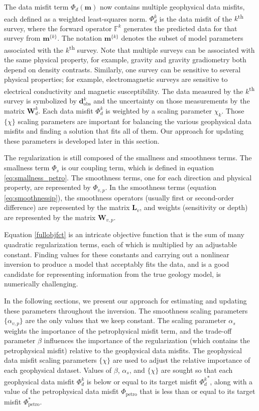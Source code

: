 \documentclass[extra, mreferee]{gji_joint} %
\begin{document}
The data misfit term $\Phi_d(\mathbf{m})$ now contains multiple geophysical data misfits, each defined as a weighted least-squares norm. $\Phi_d^k$ is the data misfit of the $k$\textsuperscript{th} survey, where the forward operator $\mathbb{F}^k$ generates the predicted data for that survey from $\mathbf{m}^{\{k\}}$. The notation $\mathbf{m}^{\{k\}}$ denotes the subset of model parameters associated with the $k$\textsuperscript{th} survey. Note that multiple surveys can be associated with the same physical property, for example, gravity and gravity gradiometry both depend on density contrasts. Similarly, one survey can be sensitive to several physical properties; for example, electromagnetic surveys are sensitive to electrical conductivity and magnetic susceptibility. The data measured by the $k$\textsuperscript{th} survey is symbolized by $\mathbf{d}_{\text{obs}}^k$ and the uncertainty on those measurements by the matrix $\mathbf{W}_{d}^k$. Each data misfit $\Phi_d^k$ is weighted by a scaling parameter $\chi_k$. Those $\{\chi\}$ scaling parameters are important for balancing the various geophysical data misfits and finding a solution that fits all of them. Our approach for updating these parameters is developed later in this section.

The regularization is still composed of the smallness and smoothness terms. The smallness term $\Phi_s$ is our coupling term, which is defined in equation \eqref{eq:smallness_petro}. The smoothness terms, one for each direction and physical property, are represented by $\Phi_{v, p}$. In the smoothness terms (equation \eqref{eq:smoothnessip}), the smoothness operators (usually first or second-order difference) are represented by the matrix $\mathbf{L}_v$, and weights (sensitivity or depth) are represented by the matrix $\mathbf{W}_{v,p}$.

Equation \ref{fullobjfct} is an intricate objective function that is the sum of many quadratic regularization terms, each of which is multiplied by an adjustable constant. Finding values for these constants and carrying out a nonlinear inversion to produce a model that acceptably fits the data, and is a good candidate for representing information from the true geology model, is numerically challenging.

In the following sections, we present our approach for estimating and updating these parameters throughout the inversion. The smoothness scaling parameters $\{\alpha_{v, p}\}$ are the only values that we keep constant. The scaling parameter $\alpha_s$ weights the importance of the petrophysical misfit term, and the trade-off parameter $\beta$ influences the importance of the regularization (which contains the petrophysical misfit) relative to the geophysical data misfits. The geophysical data misfit scaling parameters $\{\chi\}$ are used to adjust the relative importance of each geophysical dataset. Values of $\beta$, $\alpha_s$, and $\{\chi\}$ are sought so that each geophysical data misfit $\Phi_d^k$ is below or equal to its target misfit ${\Phi_d^k}^*$, along with a value of the petrophysical data misfit $\Phi_{\text{petro}}$ that is less than or equal to its target misfit $\Phi_{\text{petro}}^*$.
\end{document}
